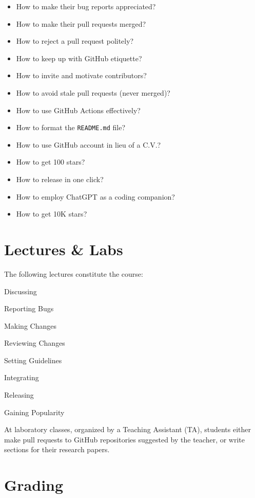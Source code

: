 \documentclass[nobrand,anonymous,nodate,nosecurity]{huawei}
\begin{document}
{\begin{itemize}
\item How to make their bug reports appreciated?
\item How to make their pull requests merged?
\item How to reject a pull request politely?
\item How to keep up with GitHub etiquette?
\item How to invite and motivate contributors?
\item How to avoid stale pull requests (never merged)?
\item How to use GitHub Actions effectively?
\item How to format the \texttt{README.md} file?
\item How to use GitHub account in lieu of a C.V.?
\item How to get 100 stars?
\item How to release in one click?
\item How to employ ChatGPT as a coding companion?
\item How to get 10K stars?
\end{itemize}

\newpage
\section*{Lectures \& Labs}

The following lectures constitute the course:

\begin{lectures}
\item Discussing
\item Reporting Bugs
\item Making Changes
\item Reviewing Changes
\item Setting Guidelines
\item Integrating
\item Releasing
\item Gaining Popularity
\end{lectures}

At laboratory classes, organized by a Teaching Assistant (TA),
students either make pull requests to
GitHub repositories suggested by the teacher, or write sections
for their research papers.

\newpage
\section*{Grading}

}
\end{document}
